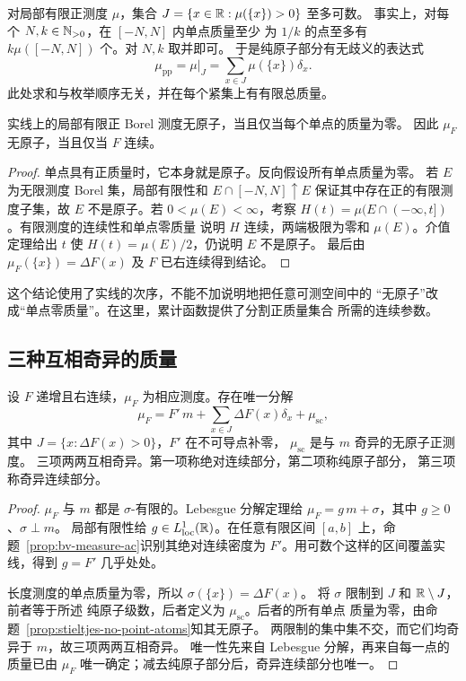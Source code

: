 对局部有限正测度 \(\mu\)，集合
\(J=\{x\in\mathbb{R}:\mu(\{x\})>0\}\) 至多可数。
事实上，对每个 \(N,k\in\mathbb{N}_{>0}\)，在 \([-N,N]\) 内单点质量至少
为 \(1/k\) 的点至多有 \(k\mu([-N,N])\) 个。对 \(N,k\) 取并即可。
于是纯原子部分有无歧义的表达式
\[
 \mu_{\mathrm{pp}}=\mu|_J=\sum_{x\in J}\mu(\{x\})\delta_x.
\]
此处求和与枚举顺序无关，并在每个紧集上有有限总质量。

\begin{proposition}\label{prop:stieltjes-no-point-atoms}
实线上的局部有限正 Borel 测度无原子，当且仅当每个单点的质量为零。
因此 \(\mu_F\) 无原子，当且仅当 \(F\) 连续。
\end{proposition}
\begin{proof}
单点具有正质量时，它本身就是原子。反向假设所有单点质量为零。
若 \(E\) 为无限测度 Borel 集，局部有限性和
\(E\cap[-N,N]\uparrow E\) 保证其中存在正的有限测度子集，故
\(E\) 不是原子。若 \(0<\mu(E)<\infty\)，考察
\(H(t)=\mu(E\cap({-\infty},t])\)。有限测度的连续性和单点零质量
说明 \(H\) 连续，两端极限为零和 \(\mu(E)\)。介值定理给出
\(t\) 使 \(H(t)=\mu(E)/2\)，仍说明 \(E\) 不是原子。
最后由 \(\mu_F(\{x\})=\Delta F(x)\) 及 \(F\) 已右连续得到结论。
\end{proof}

这个结论使用了实线的次序，不能不加说明地把任意可测空间中的
“无原子”改成“单点零质量”。在这里，累计函数提供了分割正质量集合
所需的连续参数。

\subsection{三种互相奇异的质量}

\begin{theorem}
\label{thm:stieltjes-three-parts}
设 \(F\) 递增且右连续，\(\mu_F\) 为相应测度。存在唯一分解
\begin{equation}\label{eq:stieltjes-three-parts}
 \mu_F=F'\,m+\sum_{x\in J}\Delta F(x)\delta_x+\mu_{\mathrm{sc}},
\end{equation}
其中 \(J=\{x:\Delta F(x)>0\}\)，\(F'\) 在不可导点补零，
\(\mu_{\mathrm{sc}}\) 是与 \(m\) 奇异的无原子正测度。
三项两两互相奇异。第一项称绝对连续部分，第二项称纯原子部分，
第三项称奇异连续部分。
\end{theorem}
\begin{proof}
\(\mu_F\) 与 \(m\) 都是 \(\sigma\)-有限的。Lebesgue 分解定理给
\(\mu_F=g\,m+\sigma\)，其中 \(g\ge0\)、\(\sigma\perp m\)。
局部有限性给 \(g\in L^1_{\mathrm{loc}}(\mathbb{R})\)。在任意有限区间
\([a,b]\) 上，命题~\ref{prop:bv-measure-ac}识别其绝对连续密度为
\(F'\)。用可数个这样的区间覆盖实线，得到 \(g=F'\) 几乎处处。

长度测度的单点质量为零，所以 \(\sigma(\{x\})=\Delta F(x)\)。
将 \(\sigma\) 限制到 \(J\) 和 \(\mathbb{R}\setminus J\)，前者等于所述
纯原子级数，后者定义为 \(\mu_{\mathrm{sc}}\)。后者的所有单点
质量为零，由命题~\ref{prop:stieltjes-no-point-atoms}知其无原子。
两限制的集中集不交，而它们均奇异于 \(m\)，故三项两两互相奇异。
唯一性先来自 Lebesgue 分解，再来自每一点的质量已由 \(\mu_F\)
唯一确定；减去纯原子部分后，奇异连续部分也唯一。
\end{proof}

